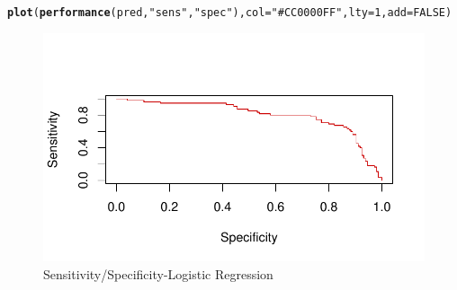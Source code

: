 \documentclass{article}\usepackage[]{graphicx}\usepackage[]{color}
\makeatletter
\def\maxwidth{ %
  \ifdim\Gin@nat@width>\linewidth
    \linewidth
  \else
    \Gin@nat@width
  \fi
}
\newcommand{\hlnum}[1]{\textcolor[rgb]{0.686,0.059,0.569}{#1}}%
\newcommand{\hlstr}[1]{\textcolor[rgb]{0.192,0.494,0.8}{#1}}%
\newcommand{\hlstd}[1]{\textcolor[rgb]{0.345,0.345,0.345}{#1}}%
\newcommand{\hlkwc}[1]{\textcolor[rgb]{0.333,0.667,0.333}{#1}}%
\newcommand{\hlkwd}[1]{\textcolor[rgb]{0.737,0.353,0.396}{\textbf{#1}}}%
\newenvironment{kframe}{%
 \def\at@end@of@kframe{}%
 \ifinner\ifhmode%
  \def\at@end@of@kframe{\end{minipage}}%
  \begin{minipage}{\columnwidth}%
 \fi\fi%
 \def\FrameCommand##1{\hskip\@totalleftmargin \hskip-\fboxsep
 \colorbox{shadecolor}{##1}\hskip-\fboxsep
     \hskip-\linewidth \hskip-\@totalleftmargin \hskip\columnwidth}%
 \MakeFramed {\advance\hsize-\width
   \@totalleftmargin\z@ \linewidth\hsize
   \@setminipage}}%
 {\par\unskip\endMakeFramed%
 \at@end@of@kframe}
\newenvironment{knitrout}{}{} %
\makeatother
\begin{document}
\begin{knitrout}
\color{fgcolor}\begin{kframe}
\begin{alltt}
\hlkwd{plot}\hlstd{(}\hlkwd{performance}\hlstd{(pred,} \hlstr{"sens"}\hlstd{,} \hlstr{"spec"}\hlstd{),} \hlkwc{col}\hlstd{=}\hlstr{"#CC0000FF"}\hlstd{,} \hlkwc{lty}\hlstd{=}\hlnum{1}\hlstd{,} \hlkwc{add}\hlstd{=}\hlnum{FALSE}\hlstd{)}
\end{alltt}
\end{kframe}\begin{figure}
\includegraphics[width=\maxwidth]{figure/unnamed-chunk-25-1} \caption[Sensitivity/Specificity-Logistic Regression]{Sensitivity/Specificity-Logistic Regression}\label{fig:unnamed-chunk-25}
\end{figure}


\end{knitrout}
\end{document}
